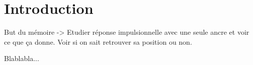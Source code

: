 % 			 
%
%

\chapter{Introduction}
\setcounter{page}{1}
\label{introduction}

But du mémoire -> Etudier réponse impulsionnelle avec une seule ancre et voir ce que ça donne. Voir si on sait retrouver sa position ou non.

Blablabla...
\cite{kulmer2017using}